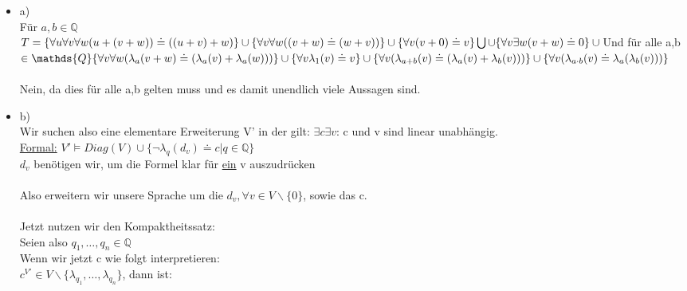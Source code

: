 \documentclass[a4paper]{scrartcl}%
\begin{document}
    \begin{itemize}
        \item a)\\
            Für $a,b \in \mathds{Q}$\\
            $T =\\
            \{\forall u \forall v \forall w (u + (v + w)) \doteq ((u + v) + w)\} \cup\\
            \{\forall v \forall w ((v + w) \doteq (w + v))\} \cup\\
            \{\forall v (v + 0) \doteq v\} \bigcup \cup\\
            \{\forall v \exists w (v + w) \doteq 0\} \cup\\
            \\$Und für alle a,b $\in \mathds{Q}\\
            \{\forall v \forall w (\lambda_a(v + w) \doteq (\lambda_a(v) + \lambda_a(w)))\} \cup\\
            \{\forall v \lambda_1(v) \doteq v\} \cup\\
            \{\forall v (\lambda_{a+b}(v) \doteq (\lambda_a(v) + \lambda_b(v)))\} \cup\\
            \{\forall v (\lambda_{a \cdot b}(v) \doteq \lambda_a(\lambda_b(v)))\}$\\
            \\Nein, da dies für alle a,b gelten muss und es damit unendlich viele Aussagen sind.\\
        \item b)\\
            Wir suchen also eine elementare Erweiterung V' in der gilt: $\exists c \exists v$: c und v sind linear unabhängig.\\ 
            \underline{Formal:} $V' \vDash Diag(V) \cup \{\neg \lambda_q(d_v) \doteq c | q \in \mathds{Q}\}$\\
            $d_v$ benötigen wir, um die Formel klar für \underline{ein}  v auszudrücken\\
            \\Also erweitern wir unsere Sprache um die $d_v, \forall v \in V\backslash \{0\}$, sowie das c.\\
            \\Jetzt nutzen wir den Kompaktheitssatz:\\
            Seien also $q_1,\dots,q_n \in \mathds{Q}$\\
            Wenn wir jetzt c wie folgt interpretieren:\\
            $c^{V'} \in V \backslash \{\lambda_{q_1},\dots,\lambda_{q_n}\}$, dann ist:\\

\end{itemize}
\end{document}
